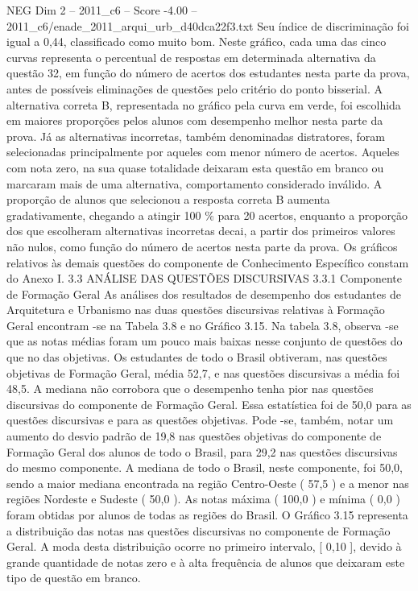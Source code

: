 \begin{textsample}{NEG Dim 2 – 2011\_c6 – Score -4.00 – 2011\_c6/enade\_2011\_arqui\_urb\_d40dca22f3.txt}
Seu índice de discriminação foi igual a 0,44, classificado como muito bom.
Neste gráfico, cada uma das cinco curvas representa o percentual de respostas em determinada alternativa da questão 32, em função do número de acertos dos estudantes nesta parte da prova, antes de possíveis eliminações de questões pelo critério do ponto bisserial.
A alternativa correta B, representada no gráfico pela curva em verde, foi escolhida em maiores proporções pelos alunos com desempenho melhor nesta parte da prova.
Já as alternativas incorretas, também denominadas distratores, foram selecionadas principalmente por aqueles com menor número de acertos.
Aqueles com nota zero, na sua quase totalidade deixaram esta questão em branco ou marcaram mais de uma alternativa, comportamento considerado inválido.
A proporção de alunos que selecionou a resposta correta B aumenta gradativamente, chegando a atingir 100 \% para 20 acertos, enquanto a proporção dos que escolheram alternativas incorretas decai, a partir dos primeiros valores não nulos, como função do número de acertos nesta parte da prova.
Os gráficos relativos às demais questões do componente de Conhecimento Específico constam do Anexo I. 3.3 ANÁLISE DAS QUESTÕES DISCURSIVAS 3.3.1 Componente de Formação Geral As análises dos resultados de desempenho dos estudantes de Arquitetura e Urbanismo nas duas questões discursivas relativas à Formação Geral encontram -se na Tabela 3.8 e no Gráfico 3.15.
Na tabela 3.8, observa -se que as notas médias foram um pouco mais baixas nesse conjunto de questões do que no das objetivas.
Os estudantes de todo o Brasil obtiveram, nas questões objetivas de Formação Geral, média 52,7, e nas questões discursivas a média foi 48,5.
A mediana não corrobora que o desempenho tenha pior nas questões discursivas do componente de Formação Geral.
Essa estatística foi de 50,0 para as questões discursivas e para as questões objetivas.
Pode -se, também, notar um aumento do desvio padrão de 19,8 nas questões objetivas do componente de Formação Geral dos alunos de todo o Brasil, para 29,2 nas questões discursivas do mesmo componente.
A mediana de todo o Brasil, neste componente, foi 50,0, sendo a maior mediana encontrada na região Centro-Oeste ( 57,5 ) e a menor nas regiões Nordeste e Sudeste ( 50,0 ).
As notas máxima ( 100,0 ) e mínima ( 0,0 ) foram obtidas por alunos de todas as regiões do Brasil.
O Gráfico 3.15 representa a distribuição das notas nas questões discursivas no componente de Formação Geral.
A moda desta distribuição ocorre no primeiro intervalo, [ 0,10 ], devido à grande quantidade de notas zero e à alta frequência de alunos que deixaram este tipo de questão em branco.

\end{textsample}
